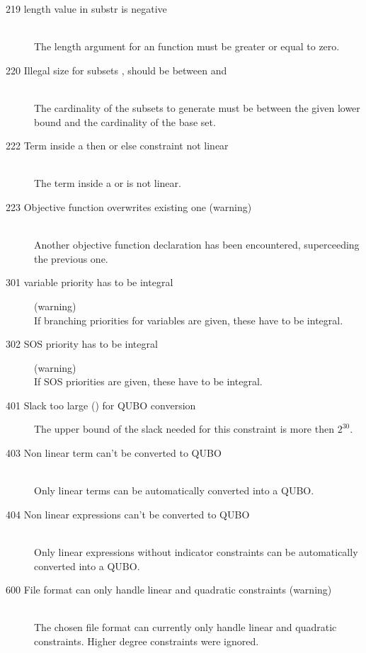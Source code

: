 \begin{description}
\item[219 length value  in substr is negative]\ \\
   The length argument for an  function
   must be greater or equal to zero.
\item[220 Illegal size for subsets , should be between  
  and ]\ \\
  The cardinality of the subsets to generate must be between the
  given lower bound and the cardinality of the base set.
\item[222 Term inside a then or else constraint not linear]\ \\
  The term inside a  or  is not linear.
\item[223 Objective function  overwrites existing one
  (warning)]\ \\
  Another objective function declaration has been encountered,
  superceeding the previous one. 
\item[301 variable priority has to be integral] (warning)\ \\
   If branching priorities for variables are given, these have to be integral.
\item[302 SOS priority has to be integral] (warning)\ \\
   If SOS priorities are given, these have to be integral.
\item [401 Slack too large () for QUBO conversion]
   The upper bound of the slack needed for this constraint is more then
   $2^{30}$.   
\item [403 Non linear term can't be converted to QUBO]\ \\
  Only linear terms can be automatically converted into a QUBO.
\item [404 Non linear expressions can't be converted to QUBO]\ \\
  Only linear expressions without indicator constraints can be
  automatically converted into a QUBO. 
\item[600 File format can only handle linear and quadratic constraints
         (warning)]\ \\
  The chosen file format can currently only handle linear and
  quadratic constraints. Higher degree constraints were ignored.

\end{description}
